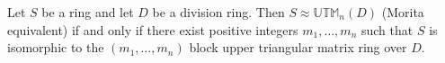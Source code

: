 Let $S$ be a ring and let $D$ be a division ring. Then $S \approx \mathbb{UTM}_n(D)$ (Morita equivalent) if and only if there exist positive integers $m_1, \ldots, m_n$ such that $S$ is isomorphic to the $(m_1, \ldots, m_n)$ block upper triangular matrix ring over $D$.
